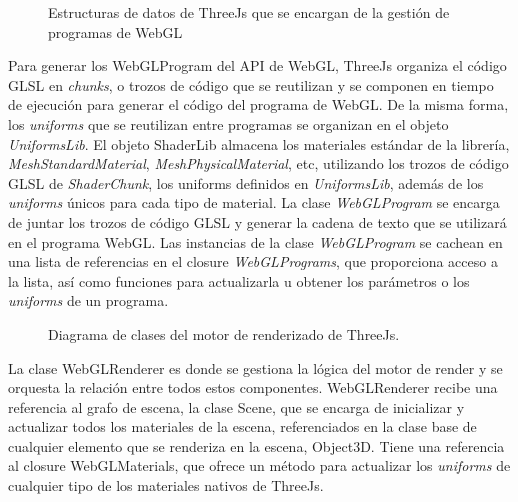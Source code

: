 \begin{figure}[H]
  \vspace{0.5cm}
  \centering
  \caption{Estructuras de datos de ThreeJs que se encargan de la gesti\'on de programas de WebGL}
\end{figure}

Para generar los WebGLProgram del API de WebGL, ThreeJs organiza el c\'odigo GLSL en \textit{chunks}, o trozos de c\'odigo
que se reutilizan y se componen en tiempo de ejecuci\'on para generar el c\'odigo del programa de WebGL. De la misma forma, los
\textit{uniforms} que se reutilizan entre programas se organizan en el objeto \textit{UniformsLib}. El objeto ShaderLib almacena
los materiales est\'andar de la librer\'ia, \textit{MeshStandardMaterial}, \textit{MeshPhysicalMaterial}, etc, utilizando los trozos
de c\'odigo GLSL de \textit{ShaderChunk}, los uniforms definidos en \textit{UniformsLib}, adem\'as de los \textit{uniforms} \'unicos
para cada tipo de material.
La clase \textit{WebGLProgram} se encarga de juntar los trozos de c\'odigo GLSL y generar la cadena de texto que se utilizar\'a en
el programa WebGL. Las instancias de la clase \textit{WebGLProgram} se cachean en una lista de referencias en el closure \textit{WebGLPrograms}, que proporciona
acceso a la lista, as\'i como funciones para actualizarla u obtener los par\'ametros o los \textit{uniforms} de un programa. \\


\begin{figure}[H]
  \vspace{0.5cm}
  \centering
  \caption{Diagrama de clases del motor de renderizado de ThreeJs.}
  \vspace{0.5cm}
\end{figure}

La clase WebGLRenderer es donde se gestiona la l\'ogica del motor de render y se orquesta la relaci\'on entre todos estos componentes.
WebGLRenderer recibe una referencia al grafo de escena, la clase Scene, que se encarga de inicializar y actualizar todos
los materiales de la escena, referenciados en la clase base de cualquier elemento que se renderiza en la escena, Object3D.
Tiene una referencia al closure WebGLMaterials, que ofrece un m\'etodo para actualizar los \textit{uniforms} de cualquier tipo
de los materiales nativos de ThreeJs.

